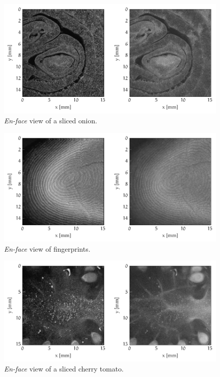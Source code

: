 \begin{figure}[hbt]
	\centering
	\includegraphics[width=\linewidth]{gfx/ch4/axsun/enface/onion-surf}
	\caption{\emph{En-face} view of a sliced onion.}\label{fig:onion-surf}
\end{figure}

\begin{figure}[hbt]
	\centering
	\includegraphics[width=\linewidth]{gfx/ch4/santec/fingervolume-2}
	\caption{\emph{En-face} view of fingerprints.}\label{fig:enface-fingerprint}
\end{figure}

\begin{figure}[hbt]
	\centering
	\includegraphics[width=\linewidth]{gfx/ch4/axsun/enface/tomato-surf}
	\caption{\emph{En-face} view of a sliced cherry tomato.}\label{fig:tomato-surf}
\end{figure}


